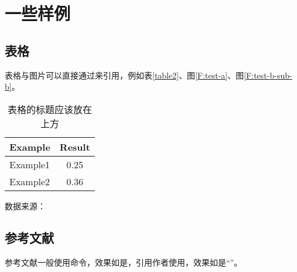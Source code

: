
\section{一些样例}

\subsection{表格}

表格与图片可以直接通过\verbbox{\ref{<key>}}来引用，例如表\ref{table2}、图\ref{F:test-a}、图\ref{F:test-b-sub-b}。

\begin{table}[htb]
    \begin{center}
        \caption{表格的标题应该放在上方}\label{table}
        \begin{tabular}{lc} %
            \toprule
            Example & Result \\
            \midrule
            Example1          & 0.25 \\
            Example2          & 0.36 \\
            \bottomrule
        \end{tabular}
    \end{center}
\end{table}

\begin{table}[htb]
    \centering
    \caption{表格的标题}
    \label{table2}
    \begin{threeparttable}
        \begin{tablenotes}
            \item[] 数据来源：%
        \end{tablenotes}
    \end{threeparttable}
\end{table}

\subsection{参考文献}

参考文献一般使用命令，效果如是\cite{Nicholas1998Handbook}，引用作者使用，效果如是“\citeauthor{goossens1994latex}”。
